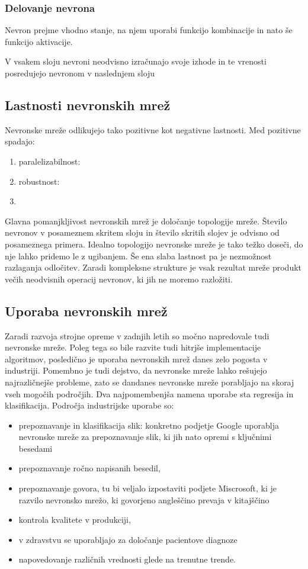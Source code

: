 \documentclass[mat1]{fmfdelo}
\begin{document}
\subsubsection{Delovanje nevrona}
Nevron prejme vhodno stanje, na njem uporabi funkcijo kombinacije in nato še funkcijo aktivacije.

V vsakem sloju nevroni neodvisno izračunajo svoje izhode in te vrenosti posredujejo nevronom v naslednjem sloju



\subsection{Lastnosti nevronskih mrež}
Nevronske mreže odlikujejo tako pozitivne kot negativne lastnosti. Med pozitivne spadajo:
\begin{enumerate}
\item paralelizabilnost:
\item robustnost:
\item 
\end{enumerate}
Glavna pomanjkljivost nevronskih mrež je določanje topologije mreže. Število nevronov v posameznem skritem sloju in število skritih slojev je odvisno od posameznega primera. Idealno topologijo nevronske mreže je tako težko doseči, do nje lahko pridemo le z ugibanjem. Še ena slaba lastnost pa je nezmožnost razlaganja odločitev. Zaradi kompleksne strukture je vsak rezultat mreže produkt večih neodvisnih operacij nevronov, ki jih ne moremo razložiti.


\subsection{Uporaba nevronskih mrež}
Zaradi razvoja strojne opreme v zadnjih letih so močno napredovale tudi nevronske mreže. Poleg tega so bile razvite tudi hitrjše implementacije algoritmov, posledično je uporaba nevronskih mrež danes zelo pogosta v industriji. Pomembno je tudi dejstvo, da nevronske mreže lahko rešujejo najrazličnejše probleme, zato se dandanes nevronske mreže porabljajo na skoraj vseh mogočih področjih. Dva najpomembenjša namena uporabe sta regresija in klasifikacija. Področja industrijske uporabe so: 
\begin{itemize}
\item prepoznavanje in klasifikacija slik: konkretno podjetje Google uporablja nevronske mreže za prepoznavanje slik, ki jih nato opremi s ključnimi besedami
\item prepoznavanje ročno napisanih besedil,
\item prepoznavanje  govora, tu bi veljalo izpostaviti podjete Miscrosoft, ki je razvilo nevronsko mrežo, ki govorjeno angleščino prevaja v kitajščino
\item kontrola kvalitete v produkciji,
\item v zdravstvu se uporabljajo za določanje pacientove diagnoze
\item napovedovanje različnih vrednosti glede na trenutne trende.

\end{itemize}
\end{document}
